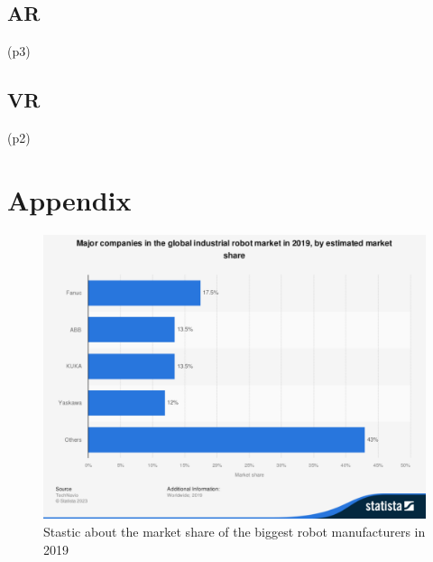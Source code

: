 \documentclass[conference]{IEEEtran}
\begin{document}
    \subsection{AR}
    

        (p3)

    \subsection{VR}

        (p2)



        
\nocite{*}





\cleardoublepage
\appendix

\section{Appendix}
    \begin{figure}[htbp!]
        \centering
        \includegraphics[scale=0.25]{./Moderne_Konzepte_Quellen/Citavi Attachments/statistic_id317178_global-industrial-robot-market-major-companies-by-market-share-2019.pdf}
        \caption{Stastic about the market share of the biggest robot manufacturers in 2019 \cite{s1}}
        \label{fig}
    \end{figure}
\end{document}
